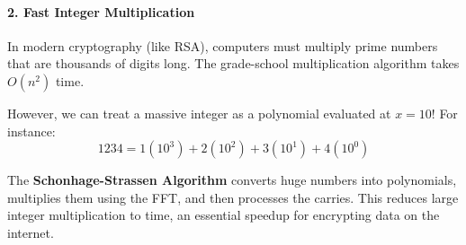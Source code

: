 \documentclass[11  pt]{article}
\begin{document}
\vs{1cm}

\paragraph{2. Fast Integer Multiplication}
In modern cryptography (like RSA), computers must multiply prime numbers that are thousands of digits long. The grade-school multiplication algorithm takes $O(n^2)$ time. 

However, we can treat a massive integer as a polynomial evaluated at $x=10$! For instance:
\begin{equation*}
    1234 = 1(10^3) + 2(10^2) + 3(10^1) + 4(10^0)
\end{equation*}

The \textbf{Schonhage-Strassen Algorithm} converts huge numbers into polynomials, multiplies them using the FFT, and then processes the carries. This reduces large integer multiplication to  time, an essential speedup for encrypting data on the internet.
\end{document}
